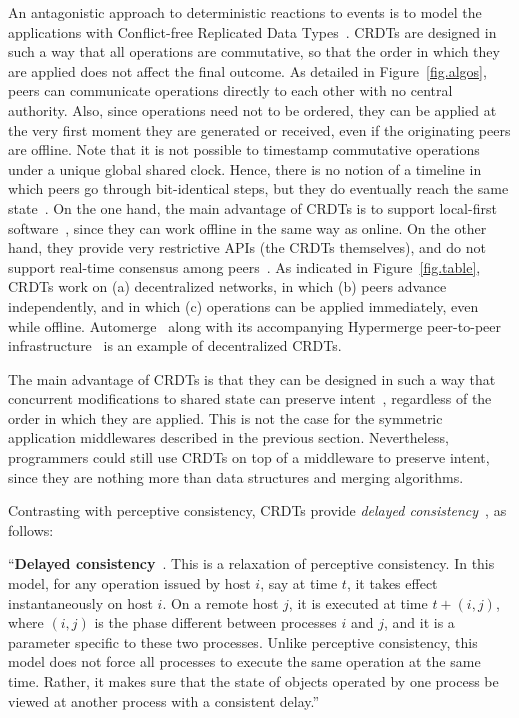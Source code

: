 \documentclass[10pt,journal,compsoc]{IEEEtran}
\begin{document}
An antagonistic approach to deterministic reactions to events is to model the
applications with Conflict-free Replicated Data Types~\cite{crdts}.
CRDTs are designed in such a way that all operations are commutative, so that
the order in which they are applied does not affect the final outcome.
%
As detailed in Figure~\ref{fig.algos}, peers can communicate operations
directly to each other with no central authority.
Also, since operations need not to be ordered, they can be applied at the
very first moment they are generated or received, even if the originating peers
are offline.
%
Note that it is not possible to timestamp commutative operations under a unique
global shared clock.
Hence, there is no notion of a timeline in which peers go through bit-identical
steps, but they do eventually reach the same state~\cite{crdts.eventual}.
%
On the one hand, the main advantage of CRDTs is to support local-first
software~\cite{local}, since they can work offline in the same way as online.
On the other hand, they provide very restrictive APIs (the CRDTs themselves),
and do not support real-time consensus among peers~\cite{crdts.consensus}.
%
As indicated in Figure~\ref{fig.table}, CRDTs work on
    (a) decentralized networks, in which
    (b) peers advance independently, and in which
    (c) operations can be applied immediately, even while offline.
%
Automerge~\cite{p2p.automerge} along with its accompanying Hypermerge
peer-to-peer infrastructure~\cite{p2p.pushpin} is an example of decentralized
CRDTs.

The main advantage of CRDTs is that they can be designed in such a way that
concurrent modifications to shared state can preserve intent~\cite{peritext},
regardless of the order in which they are applied.
%
This is not the case for the symmetric application middlewares described in the
previous section.
Nevertheless, programmers could still use CRDTs on top of a middleware to
preserve intent, since they are nothing more than data structures and merging
algorithms.

Contrasting with perceptive consistency, CRDTs provide \emph{delayed
consistency}~\cite{melding}, as follows:

``\textbf{Delayed consistency}~\cite{qin}.
This is a relaxation of perceptive consistency.
In this model, for any operation issued by host $i$, say at time $t$, it takes
effect instantaneously on host $i$.
On a remote host $j$, it is executed at time $t + (i,j)$, where $(i,j)$ is the
phase different between processes $i$ and $j$, and it is a parameter specific
to these two processes.
Unlike perceptive consistency, this model does not force all processes to
execute the same operation at the same time.
Rather, it makes sure that the state of objects operated by one process be
viewed at another process with a consistent delay.''
\end{document}
